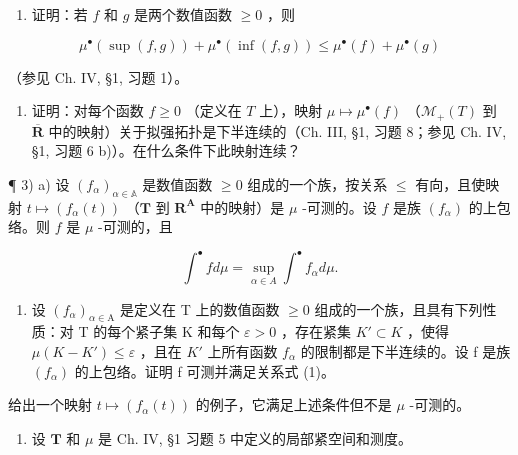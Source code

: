 \begin{enumerate}
\def\labelenumi{\arabic{enumi})}
\tightlist
\item
  证明：若 \(f\) 和 \(g\) 是两个数值函数 \(\geqslant 0\) ，则
\end{enumerate}

\[
\mu^ {\bullet} (\sup (f, g)) + \mu^ {\bullet} (\inf (f, g)) \leqslant \mu^ {\bullet} (f) + \mu^ {\bullet} (g)
\]

（参见 Ch. IV, §1, 习题 1）。

\begin{enumerate}
\def\labelenumi{\arabic{enumi})}
\setcounter{enumi}{1}
\tightlist
\item
  证明：对每个函数 \(f \geqslant 0\) （定义在 \(T\) 上），映射 \(\mu \mapsto \mu^{\bullet}(f)\) （\(\mathcal{M}_{+}(T)\) 到 \(\overline{\mathbf{R}}\) 中的映射）关于拟强拓扑是下半连续的（Ch. III, §1, 习题 8；参见 Ch. IV, §1, 习题 6 b)）。在什么条件下此映射连续？
\end{enumerate}

¶ 3) a) 设 \((f_{\alpha})_{\alpha \in \mathbb{A}}\) 是数值函数 \(\geqslant 0\) 组成的一个族，按关系 \(\leqslant\) 有向，且使映射 \(t \mapsto (f_{\alpha}(t))\) （\(\mathbf{T}\) 到 \(\mathbf{R}^{\mathbf{A}}\) 中的映射）是 \(\mu\) -可测的。设 \(f\) 是族 \((f_{\alpha})\) 的上包络。则 \(f\) 是 \(\mu\) -可测的，且

\[
\int^ {\bullet} f d \mu = \sup _ {\alpha \in A} \int^ {\bullet} f _ {\alpha} d \mu .\tag{1}
\]

\begin{enumerate}
\def\labelenumi{\alph{enumi})}
\setcounter{enumi}{1}
\tightlist
\item
  设 \((f_{\alpha})_{\alpha\in\mathrm{A}}\) 是定义在 T 上的数值函数 \(\geqslant0\) 组成的一个族，且具有下列性质：对 T 的每个紧子集 K 和每个 \(\varepsilon>0\) ，存在紧集 \(K'\subset K\) ，使得 \(\mu(K-K')\leqslant\varepsilon\) ，且在 \(K'\) 上所有函数 \(f_{\alpha}\) 的限制都是下半连续的。设 f 是族 \((f_{\alpha})\) 的上包络。证明 f 可测并满足关系式 (1)。
\end{enumerate}

给出一个映射 \(t \mapsto (f_{\alpha}(t))\) 的例子，它满足上述条件但不是 \(\mu\) -可测的。

\begin{enumerate}
\def\labelenumi{\arabic{enumi})}
\setcounter{enumi}{3}
\tightlist
\item
  设 \(\mathbf{T}\) 和 \(\mu\) 是 Ch. IV, §1 习题 5 中定义的局部紧空间和测度。
\end{enumerate}

